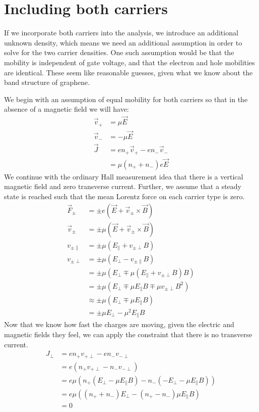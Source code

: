 \documentclass[twocolumn]{revtex4-1}
\begin{document}
\section{Including both carriers}
If we incorporate both carriers into the analysis, we introduce an
additional unknown density, which means we need an additional
assumption in order to solve for the two carrier densities.  One such
assumption would be that the mobility is independent of gate voltage,
and that the electron and hole mobilities are identical.  These seem
like reasonable guesses, given what we know about the band structure
of graphene.

We begin with an assumption of equal mobility for both carriers so
that in the absence of a magnetic field we will have:
\begin{align}
  \vec{v}_+ &= \mu \vec{E} \\
  \vec{v}_- &= -\mu \vec{E} \\
  \vec{J} &= e n_+ \vec{v}_+ - e n_- \vec{v}_- \\
  &= \mu\left(n_+ + n_-\right) e \vec{E}
\end{align}
We continue with the ordinary Hall measurement idea that there is a
vertical magnetic field and zero transverse current.  Further, we
assume that a steady state is reached such that the mean Lorentz force
on each carrier type is zero.
\begin{align}
  \vec{F}_\pm &= \pm e(\vec{E} + \vec{v}_\pm\times\vec{B}) \\
  \vec{v}_\pm &= \pm \mu (\vec{E} + \vec{v}_\pm\times\vec{B}) \\
  v_{\pm\parallel} &= \pm \mu (E_\parallel + v_{\pm\perp}B) \\
  v_{\pm\perp} &= \pm \mu (E_\perp - v_{\pm\parallel}B) \\
  &= \pm \mu (E_\perp \mp \mu (E_\parallel + v_{\pm\perp}B)B) \\
  &= \pm \mu (E_\perp \mp \mu E_\parallel B \mp \mu v_{\pm\perp}B^2) \\
  &\approx \pm \mu (E_\perp \mp \mu E_\parallel B) \\
  &= \pm \mu E_\perp - \mu^2 E_\parallel B
\end{align}
Now that we know how fast the charges are moving, given the electric
and magnetic fields they feel, we can apply the constraint that there
is no transverse current.
\begin{align}
  J_\perp
  &= en_+v_{+\perp} - en_-v_{-\perp} \\
  &= e(n_+v_{+\perp} - n_-v_{-\perp}) \\
  &= e\mu\left(n_+(E_\perp - \mu E_\parallel B)
  - n_-(-E_\perp - \mu E_\parallel B) \right) \\
             &= e\mu\left( (n_+ + n_-) E_\perp
             - (n_+ - n_-)\mu E_\parallel B \right) \\
             &= 0
\end{align}
\end{document}
